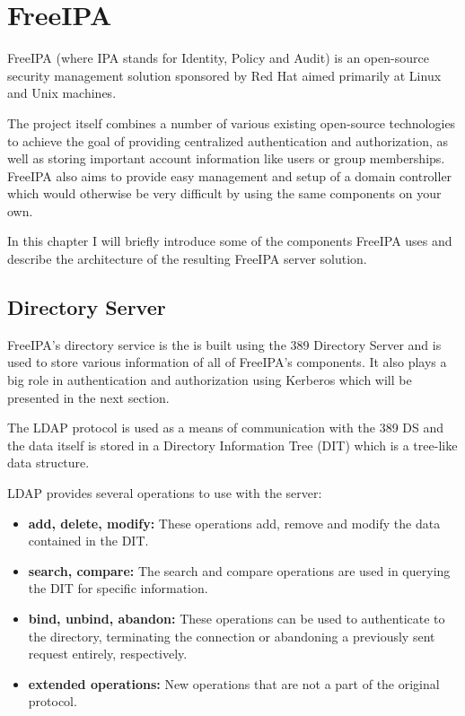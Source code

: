 
\chapter{FreeIPA}

FreeIPA (where IPA stands for Identity, Policy and Audit) is an open-source security management solution sponsored by Red Hat aimed primarily at Linux and Unix machines\cite{ipaWeb}.

The project itself combines a number of various existing open-source technologies to achieve the goal of providing centralized authentication and authorization, as well as storing important account information like users or group memberships.
FreeIPA also aims to provide easy management and setup of a domain controller which would otherwise be very difficult by using the same components on your own.

In this chapter I will briefly introduce some of the components FreeIPA uses and describe the architecture of the resulting FreeIPA server solution.

\section{Directory Server}
FreeIPA's directory service is the is built using the 389 Directory Server\cite{ldapWeb} and is used to store various information of all of FreeIPA's components.
It also plays a big role in authentication and authorization using Kerberos which will be presented in the next section.

The LDAP protocol\cite{ldapRFC} is used as a means of communication with the 389 DS and the data itself is stored in a Directory Information Tree (DIT) which is a tree-like data structure.

LDAP provides several operations to use with the server\cite{ldapRFC}:

\begin{itemize}
    \item \textbf{add, delete, modify:} These operations add, remove and modify the data contained in the DIT.
    \item \textbf{search, compare:} The search and compare operations are used in querying the DIT for specific information.
    \item \textbf{bind, unbind, abandon:} These operations can be used to authenticate to the directory, terminating the connection or abandoning a previously sent request entirely, respectively.
    \item \textbf{extended operations:} New operations that are not a part of the original protocol.
\end{itemize}

